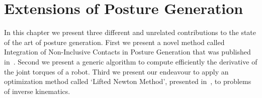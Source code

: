 

\chapter{Extensions of Posture Generation}
\label{cha:extensions_of_posture_generation}

\graphicspath{{Chapter2-Extensions/Figs/}{Chapter2-Extensions/Figs/IROS14/}}

In this chapter we present three different and unrelated contributions to the state of the art of posture generation.
First we present a novel method called Integration of Non-Inclusive Contacts in Posture Generation that was published in~\cite{brossette:iros:2014}.
Second we present a generic algorithm to compute efficiently the derivative of the joint torques of a robot.
Third we present our endeavour to apply an optimization method called `Lifted Newton Method', presented in~\cite{Albersmeyer:2010:LNM:1958447.1958472}, to problems of inverse kinematics.



